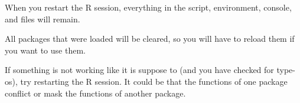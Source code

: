\documentclass[
]{book}
\begin{document}
When you restart the R session, everything in the script, environment, console, and files will remain.

All packages that were loaded will be cleared, so you will have to reload them if you want to use them.

If something is not working like it is suppose to (and you have checked for type-os), try restarting the R session. It could be that the functions of one package conflict or mask the functions of another package.

  
\end{document}
